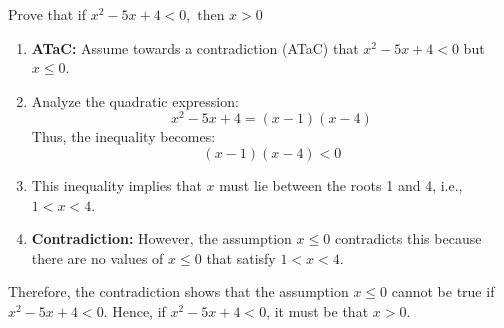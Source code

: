     \begin{example}
        Prove that if $x^2 - 5x + 4 < 0, \text{ then } x >0$
        \begin{enumerate}
            \item \textbf{ATaC:} Assume towards a contradiction (ATaC) that \( x^2 - 5x + 4 < 0 \) but \( x \leq 0 \).
            \vspace{1em}
            \item Analyze the quadratic expression:
            \[
            x^2 - 5x + 4 = (x - 1)(x - 4)
            \]
            Thus, the inequality becomes:
            \[
            (x - 1)(x - 4) < 0
            \]
            
            \item This inequality implies that \( x \) must lie between the roots 1 and 4, i.e., \( 1 < x < 4 \).
            \vspace{1em}
            \item \textbf{Contradiction:} However, the assumption \( x \leq 0 \) contradicts this because there are no values of \( x \leq 0 \) that satisfy \( 1 < x < 4 \).
            \end{enumerate}
            \vspace{1em}
            Therefore, the contradiction shows that the assumption \( x \leq 0 \) cannot be true if \( x^2 - 5x + 4 < 0 \). Hence, if \( x^2 - 5x + 4 < 0 \), it must be that \( x > 0 \).
    \end{example}


